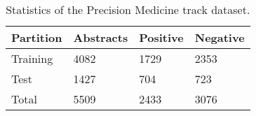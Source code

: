 \begingroup

\begin{table}[!tb]

\caption{Statistics of the Precision Medicine track dataset.}
\label{tab:pm-dataset}

\centering


\begin{tabular}{D{30mm}G{20mm}G{20mm}G{20mm}}

\toprule

Partition & Abstracts & Positive & Negative\\

\midrule

Training  & 4082 & 1729 & 2353\\
Test      & 1427 &  704 &  723\\

\midrule

Total     & 5509 & 2433 & 3076\\

\bottomrule

\end{tabular}
\end{table}
\endgroup
